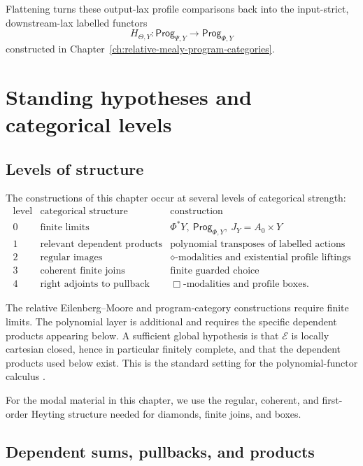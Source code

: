 Flattening turns these output-lax profile comparisons back into the
input-strict, downstream-lax labelled functors
\[
H_{\Theta,Y}:
\mathsf{Prog}_{\Psi,Y}\to\mathsf{Prog}_{\Phi,Y}
\]
constructed in Chapter~\ref{ch:relative-mealy-program-categories}.

\section{Standing hypotheses and categorical levels}
\label{sec:poly-relative-hypotheses}

\subsection{Levels of structure}
\label{subsec:poly-relative-levels}

The constructions of this chapter occur at several levels of categorical
strength:
\[
\begin{array}{c|c|c}
\text{level} & \text{categorical structure} & \text{construction} \\
\hline
0 & \text{finite limits} &
\Phi^\ast Y,\ \mathsf{Prog}_{\Phi,Y},\ J_Y=A_0\times Y \\
1 & \text{relevant dependent products} &
\text{polynomial transposes of labelled actions} \\
2 & \text{regular images} &
\diamond\text{-modalities and existential profile liftings} \\
3 & \text{coherent finite joins} &
\text{finite guarded choice} \\
4 & \text{right adjoints to pullback} &
\Box\text{-modalities and profile boxes}.
\end{array}
\]

The relative Eilenberg--Moore and program-category constructions require
finite limits.  The polynomial layer is additional and requires the specific
dependent products appearing below.  A sufficient global hypothesis is that
\(\mathcal E\) is locally cartesian closed, hence in particular finitely
complete, and that the dependent products used below exist.  This is the
standard setting for the polynomial-functor calculus
\cite{GambinoKock2013Polynomial}.

For the modal material in this chapter, we use the regular, coherent, and
first-order Heyting structure needed for diamonds, finite joins, and boxes.

\subsection{Dependent sums, pullbacks, and products}
\label{subsec:poly-relative-dependent-operators}

